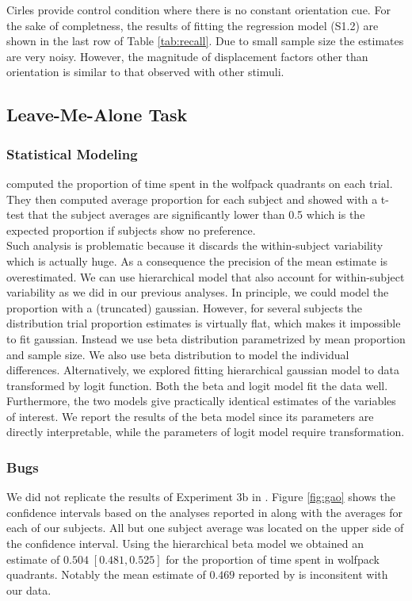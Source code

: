 \documentclass[10pt]{article}
\begin{document}
Cirles provide control condition where there is no constant orientation cue. For the sake of completness, the results of fitting the regression model (S1.2) are shown in the last row of Table \ref{tab:recall}. Due to small sample size the estimates are very noisy. However, the magnitude of displacement factors other than orientation is similar to that observed with other stimuli.

\subsection*{Leave-Me-Alone Task}
\subsubsection*{Statistical Modeling}
\cite{gao10} computed the proportion of time spent in the wolfpack quadrants on each trial. They then computed average proportion for each subject and showed with a t-test that the subject averages are significantly lower than 0.5 which is the expected proportion if subjects show no preference.\\
Such analysis is problematic because it discards the within-subject variability which is actually huge. As a consequence the precision of the mean estimate is overestimated. We can use hierarchical model that also account for within-subject variability as we did in our previous analyses. In principle, we could model the proportion with a (truncated) gaussian. However, for several subjects the distribution trial proportion estimates is virtually flat, which makes it impossible to fit gaussian. Instead we use beta distribution parametrized by mean proportion and sample size. We also use beta distribution to model the individual differences. Alternatively, we explored fitting hierarchical gaussian model to data transformed by logit function. Both the beta and logit model fit the data well. Furthermore, the two models give practically identical estimates of the variables of interest. We report the results of the beta model since its parameters are directly interpretable, while the parameters of logit model require transformation.\\

\subsubsection*{Bugs}
We did not replicate the results of Experiment 3b in \cite{gao10}. Figure \ref{fig:gao} shows the confidence intervals based on the analyses reported in \cite{gao10} along with the averages for each of our subjects. All but one subject average was located on the upper side of the confidence interval. Using the hierarchical beta model we obtained an estimate of $0.504 \; [0.481,0.525] $ for the proportion of time spent in wolfpack quadrants. Notably the mean estimate of $0.469$ reported by \cite{gao10} is inconsitent with our data.\\
\end{document}
